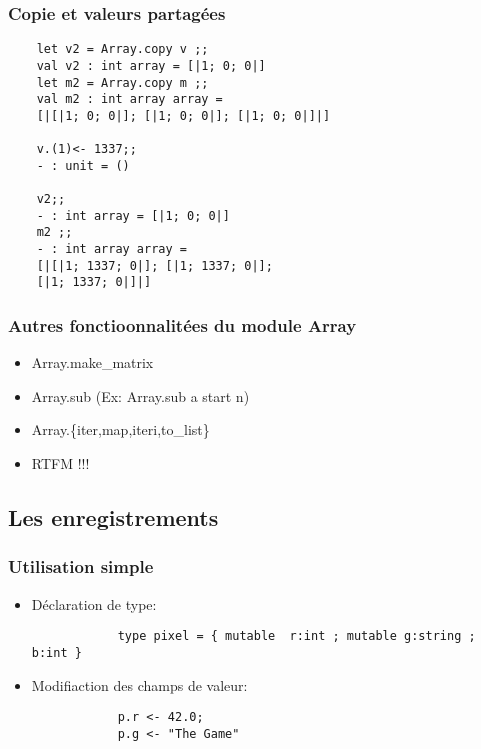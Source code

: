 \begin{frame}[fragile]
\frametitle{Copie et valeurs partagées}
\begin{lstlisting}
	let v2 = Array.copy v ;;
	val v2 : int array = [|1; 0; 0|]
	let m2 = Array.copy m ;;
	val m2 : int array array = 
	[|[|1; 0; 0|]; [|1; 0; 0|]; [|1; 0; 0|]|]

	v.(1)<- 1337;;
	- : unit = ()

	v2;; 
	- : int array = [|1; 0; 0|]
	m2 ;;
	- : int array array = 
	[|[|1; 1337; 0|]; [|1; 1337; 0|]; 
	[|1; 1337; 0|]|]
\end{lstlisting}
\end{frame}

\begin{frame}[fragile]
\frametitle{Autres fonctioonnalitées du module Array}
\begin{itemize}
	\item Array.make\_matrix
	
	\item Array.sub (Ex: Array.sub a start n)
	
	\item Array.\{iter,map,iteri,to\_list\}

	\item RTFM !!!
\end{itemize}
\end{frame}

\subsection{Les enregistrements}

\begin{frame}[fragile]
\frametitle{Utilisation simple}
\begin{itemize}
	\item Déclaration de type: 
		\begin{lstlisting}
			type pixel = { mutable  r:int ; mutable g:string ; b:int } 
		\end{lstlisting}
	
	\item Modifiaction des champs de valeur:
		\begin{lstlisting}
			p.r <- 42.0;
			p.g <- "The Game"
		\end{lstlisting}
\end{itemize}
\end{frame}
